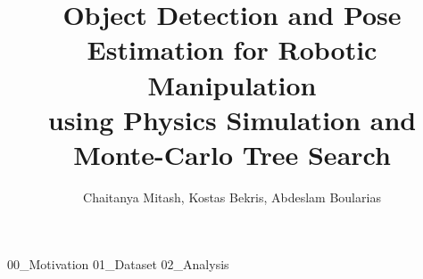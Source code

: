 \documentclass[final]{beamer}
\title[Dataset]{Object Detection and Pose Estimation for Robotic Manipulation\\using Physics Simulation and Monte-Carlo Tree Search}
\author[Mitash]{Chaitanya Mitash, Kostas Bekris, Abdeslam Boularias}
\institute[RutgersFUES]{Rutgers, the State University of New Jersey}
\newlength{\blocklen}
\begin{document}
  \setlength{\blocklen}{0.49\textwidth}
  \begin{frame}{} 
    \vspace {-0.5in}
     {00_Motivation}
    \vfill
     {01_Dataset}
    \vfill
     {02_Analysis}
    \vfill
  \end{frame}
\end{document}
